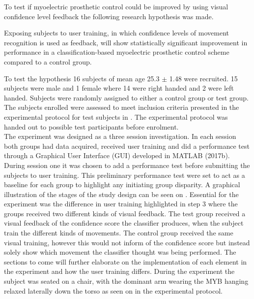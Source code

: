 To test if myoelectric prosthetic control could be improved by using visual confidence level feedback the following research hypothesis was made.  
\begin{center}
	Exposing subjects to user training, in which confidence levels of movement recognition is used as feedback, will show statistically significant improvement in performance in a classification-based myoelectric prosthetic control scheme compared to a control group.
\end{center}


To test the hypothesis 16 subjects of mean age 25.3 $\pm$ 1.48 were recruited. 15 subjects were male and 1 female where 14 were right handed and 2 were left handed. Subjects were randomly assigned to either a control group or test group. The subjects enrolled were assessed to meet inclusion criteria presented in the experimental protocol for test subjects in . The experimental protocol was handed out to possible test participants before enrolment. \\
The experiment was designed as a three session investigation. In each session both groups had data acquired, received user training and did a performance test through a Graphical User Interface (GUI) developed in MATLAB (2017b). During session one it was chosen to add a performance test before submitting the subjects to user training. This preliminary performance test were set to act as a baseline for each group to highlight any initiating group disparity. A graphical illustration of the stages of the study design can be seen on . Essential for the experiment was the difference in user training highlighted in step 3 where the groups received two different kinds of visual feedback. The test group received a visual feedback of the confidence score the classifier produces, when the subject train the different kinds of movements. The control group received the same visual training, however this would not inform of the confidence score but instead solely show which movement the classifier thought was being performed. The sections to come will further elaborate on the implementation of each element in the experiment and how the user training differs. During the experiment the subject was seated on a chair, with the dominant arm wearing the MYB hanging relaxed laterally down the torso as seen on  in the experimental protocol. 


